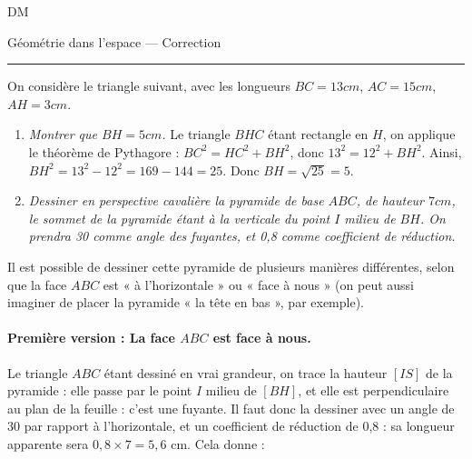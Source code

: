 \documentclass[10pt]{article}
\begin{document}
\begin{center}
  \textsc{DM}

  {
    \Large
    Géométrie dans l'espace --- Correction

    \hrule
  }
\end{center}

\begin{exercice}
  On considère le triangle suivant, avec les longueurs $BC=13cm$, $AC=15cm$, $AH=3cm$.

  \begin{center}
\end{center}

  \begin{enumerate}
    \item \emph{Montrer que $BH=5cm$.} Le triangle $BHC$ étant rectangle en $H$, on applique le théorème de Pythagore : $BC^2=HC^2+BH^2$, donc $13^2=12^2+BH^2$. Ainsi, $BH^2=13^2-12^2=169-144=25$. Donc $BH=\sqrt{25}=5$.
    \item \emph{Dessiner en perspective cavalière la pyramide de base $ABC$, de hauteur $7cm$, le sommet de la pyramide étant à la verticale du point $I$ milieu de $BH$. On prendra 30 comme angle des fuyantes, et 0,8 comme coefficient de réduction.}
  \end{enumerate}
\end{exercice}

Il est possible de dessiner cette pyramide de plusieurs manières différentes, selon que la face $ABC$ est « à l'horizontale » ou « face à nous » (on peut aussi imaginer de placer la pyramide « la tête en bas », par exemple).

\paragraph{Première version : La face $ABC$ est face à nous.} Le triangle $ABC$ étant dessiné en vrai grandeur, on trace la hauteur $[IS]$ de la pyramide : elle passe par le point $I$ milieu de $[BH]$, et elle est perpendiculaire au plan de la feuille : c'est une fuyante. Il faut donc la dessiner avec un angle de 30 par rapport à l'horizontale, et un coefficient de réduction de 0,8 : sa longueur apparente sera $0,8\times7=5,6\text{~cm}$. Cela donne :
\end{document}
